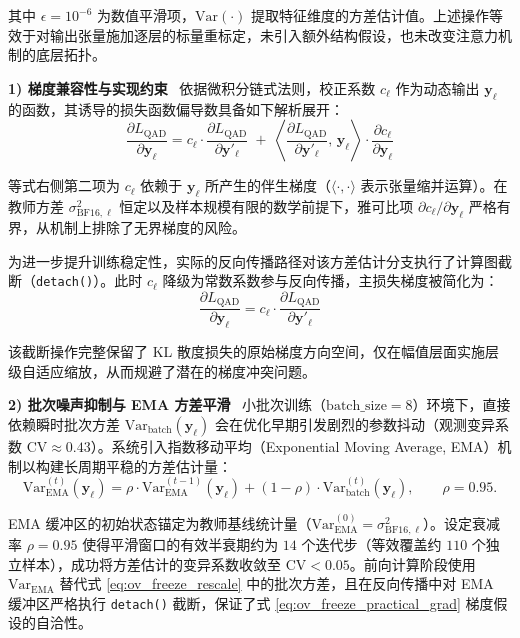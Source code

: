 \documentclass[11pt, a4paper]{article}
\begin{document}
其中 $\epsilon=10^{-6}$ 为数值平滑项，$\mathrm{Var}(\cdot)$ 提取特征维度的方差估计值。上述操作等效于对输出张量施加逐层的标量重标定，未引入额外结构假设，也未改变注意力机制的底层拓扑。

\textbf{1) 梯度兼容性与实现约束}
~依据微积分链式法则，校正系数 $c_\ell$ 作为动态输出 $\bm{y}_\ell$ 的函数，其诱导的损失函数偏导数具备如下解析展开：
\begin{equation}
\label{eq:ov_freeze_full_grad}
    \frac{\partial L_{\text{QAD}}}{\partial \bm{y}_\ell}
    =
    c_\ell \cdot \frac{\partial L_{\text{QAD}}}{\partial \bm{y}'_\ell}
    \;+\;
    \left\langle
    \frac{\partial L_{\text{QAD}}}{\partial \bm{y}'_\ell},\, \bm{y}_\ell
    \right\rangle
    \cdot
    \frac{\partial c_\ell}{\partial \bm{y}_\ell}
\end{equation}

等式右侧第二项为 $c_\ell$ 依赖于 $\bm{y}_\ell$ 所产生的伴生梯度（$\langle\cdot,\cdot\rangle$ 表示张量缩并运算）。在教师方差 $\sigma^2_{\text{BF16},\ell}$ 恒定以及样本规模有限的数学前提下，雅可比项 $\partial c_\ell/\partial \bm{y}_\ell$ 严格有界，从机制上排除了无界梯度的风险。

为进一步提升训练稳定性，实际的反向传播路径对该方差估计分支执行了计算图截断（\texttt{detach()}）。此时 $c_\ell$ 降级为常数系数参与反向传播，主损失梯度被简化为：
\begin{equation}
\label{eq:ov_freeze_practical_grad}
    \frac{\partial L_{\text{QAD}}}{\partial \bm{y}_\ell}
    =
    c_\ell \cdot \frac{\partial L_{\text{QAD}}}{\partial \bm{y}'_\ell}
\end{equation}

该截断操作完整保留了 KL 散度损失的原始梯度方向空间，仅在幅值层面实施层级自适应缩放，从而规避了潜在的梯度冲突问题。

\textbf{2) 批次噪声抑制与 EMA 方差平滑}
~小批次训练（$\text{batch\_size}=8$）环境下，直接依赖瞬时批次方差 $\mathrm{Var}_{\text{batch}}(\bm{y}_\ell)$ 会在优化早期引发剧烈的参数抖动（观测变异系数 $\mathrm{CV}\approx 0.43$）。系统引入指数移动平均（Exponential Moving Average, EMA）机制以构建长周期平稳的方差估计量：
\begin{equation}
\label{eq:ov_freeze_ema}
    \mathrm{Var}^{(t)}_{\text{EMA}}(\bm{y}_\ell)
    =
    \rho \cdot \mathrm{Var}^{(t-1)}_{\text{EMA}}(\bm{y}_\ell)
    + (1-\rho)\cdot \mathrm{Var}^{(t)}_{\text{batch}}(\bm{y}_\ell),
    \qquad \rho=0.95.
\end{equation}

EMA 缓冲区的初始状态锚定为教师基线统计量（$\mathrm{Var}^{(0)}_{\text{EMA}}=\sigma^2_{\text{BF16},\ell}$）。设定衰减率 $\rho=0.95$ 使得平滑窗口的有效半衰期约为 $14$ 个迭代步（等效覆盖约 $110$ 个独立样本），成功将方差估计的变异系数收敛至 $\mathrm{CV}<0.05$。前向计算阶段使用 $\mathrm{Var}_{\text{EMA}}$ 替代式 \eqref{eq:ov_freeze_rescale} 中的批次方差，且在反向传播中对 EMA 缓冲区严格执行 \texttt{detach()} 截断，保证了式 \eqref{eq:ov_freeze_practical_grad} 梯度假设的自洽性。
\end{document}
